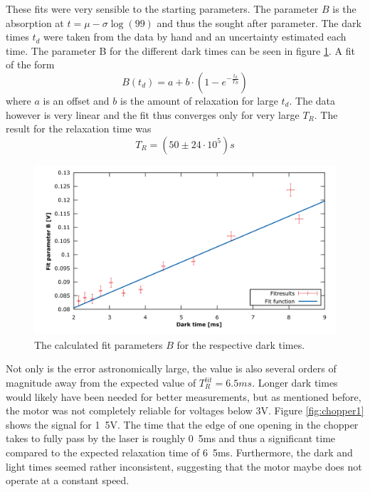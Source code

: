 These fits were very sensible to the starting parameters. The parameter $B$ is the absorption at $t=\mu-\sigma\log(99)$ and thus the sought after parameter. The dark times $t_d$ were taken from the data by hand and an uncertainty estimated each time. The parameter B for the different dark times can be seen in figure \ref{fig:Bparfit}. A fit of the form
\begin{equation}
B(t_d)=a+b\cdot(1-e^{-\frac{t_d}{T_R}})
\end{equation} 
where $a$ is an offset and $b$ is the amount of relaxation for large $t_d$. The data however is very linear and the fit thus converges only for very large $T_R$. The result for the relaxation time was
\begin{equation}
T_R=\unit{(50\pm24\cdot10^5)}{s}
\end{equation}

\begin{figure}
	\centering
	\includegraphics[width=1.0\linewidth]{graphics/Bparfit}
	\caption[Relaxation time fit Franzen]{The calculated fit parameters $B$ for the respective dark times.}
	\label{fig:Bparfit}
\end{figure}

Not only is the error astronomically large, the value is also several orders of magnitude away from the expected value of $T_R^{lit}=\unit{6.5}{ms}$. Longer dark times would likely have been needed for better measurements, but as mentioned before, the motor was not completely reliable for voltages below \unit{3}{V}. Figure \ref{fig:chopper1} shows the signal for \unit{1.5}{V}. The time that the edge of one opening in the chopper takes to fully pass by the laser is roughly \unit{0.5}{ms} and thus a significant time compared to the expected relaxation time of \unit{6.5}{ms}. Furthermore, the dark and light times seemed rather inconsistent, suggesting that the motor maybe does not operate at a constant speed. 



